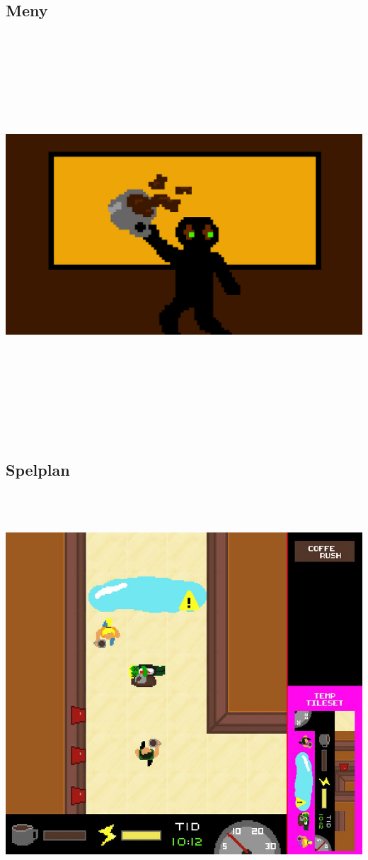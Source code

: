 \documentclass{template}
\begin{document}
\subsection{Meny}
\includegraphics[width=15cm,height=15cm]{tdp005kravspe2c}
\subsection{Spelplan}
\includegraphics[width=15cm,height=15cm]{gamescreen2}
\end{document}
